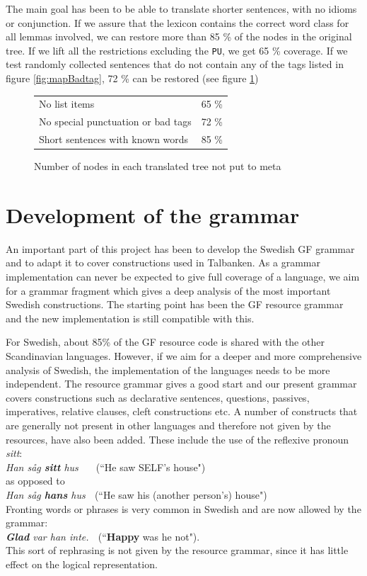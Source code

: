 \documentclass[10pt, a4paper]{article}
\begin{document}
The main goal has been to be able to translate shorter sentences, with no
idioms or conjunction.
If we assure that the lexicon contains the correct word class for all lemmas
involved, we
can restore more than 85 \% of the nodes in the original tree.
If we lift all the restrictions excluding the \verb|PU|, we get
65 \% coverage. 
If we test randomly collected sentences that do not contain any of the tags listed
in figure \ref{fig:mapBadtag}, 72 \% can be restored (see figure \ref{tab:mappres})

\begin{figure}[h]
\begin{tabular}{|ll|}
\hline
No list items & 65 \%\\
No special punctuation or bad tags& 72 \%\\
Short sentences with known words & 85 \%\\
\hline
\end{tabular}
\caption{Number of nodes in each translated tree not put to meta}
\label{tab:mappres}
\end{figure}

\section{Development of the grammar}
\label{sec:grammar}
An important part of this project has been to develop the Swedish GF grammar and
to adapt it to cover constructions used in Talbanken. As a grammar
implementation can never be expected to give
full coverage of a language, we aim for a grammar fragment which gives a deep
analysis of the most important Swedish constructions.
The starting point has been the GF resource grammar and the new implementation is
still compatible with this.

For Swedish, about 85\% of the GF resource code is shared with the other Scandinavian
languages. 
However, if we aim for a deeper and more comprehensive analysis of Swedish,
the implementation of the languages needs to be more independent.
The resource grammar gives a good start and our present grammar 
covers constructions such as declarative sentences, questions, passives,
imperatives, relative clauses, cleft constructions etc.
A number of constructs that are generally not present in other languages and
therefore not given by the resources, have also been added. These include the use of
the reflexive pronoun \emph{sitt}: \\
\emph{Han s{\aa}g \textbf{sitt} hus} $\; \; \; \;$ (``He saw SELF's house") $\;$ \\
as opposed to \\
\emph{Han s{\aa}g \textbf{hans} hus} $\;$ (``He saw his (another person's) house") \\
Fronting words or phrases is very common in Swedish and are now allowed by the grammar:\\
\emph{\textbf{Glad} var han inte.} $\;$ (``\textbf{Happy} was he not"). \\
This sort of rephrasing is not given by the resource grammar, since it
has little effect on the logical representation.
\end{document}

